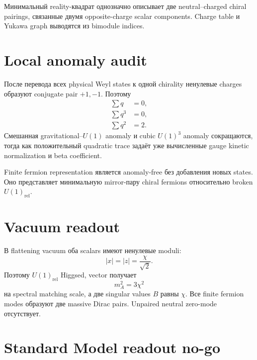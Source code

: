 \begin{theorem}
Минимальный reality-квадрат однозначно описывает две neutral--charged
chiral pairings, связанные двумя opposite-charge scalar components.
Charge table и Yukawa graph выводятся из bimodule indices.
\end{theorem}

\section{Local anomaly audit}

После перевода всех physical Weyl states к одной chirality ненулевые
charges образуют conjugate pair \(+1,-1\). Поэтому
\begin{align}
 \sum q&=0,
 \\
 \sum q^3&=0,
 \\
 \sum q^2&=2.
\end{align}
Смешанная gravitational--\(U(1)\) anomaly и cubic \(U(1)^3\) anomaly
сокращаются, тогда как положительный quadratic trace задаёт уже
вычисленные gauge kinetic normalization и beta coefficient.

\begin{proposition}
Finite fermion representation является anomaly-free без добавления новых
states. Оно представляет минимальную mirror-пару chiral fermions
относительно broken \(U(1)_{\mathrm{rel}}\).
\end{proposition}

\section{Vacuum readout}

В flattening vacuum оба scalars имеют ненулевые moduli:
\begin{equation}
 |x|=|z|=\frac{\chi}{\sqrt2}.
\end{equation}
Поэтому \(U(1)_{\mathrm{rel}}\) Higgsed, vector получает
\begin{equation}
 m_A^2=3\chi^2
\end{equation}
на spectral matching scale, а две singular values \(B\) равны \(\chi\).
Все finite fermion modes образуют две massive Dirac pairs. Unpaired
neutral zero-mode отсутствует.

\section{Standard Model readout no-go}

